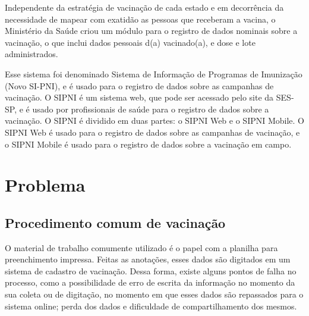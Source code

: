 Independente da estratégia de vacinação de cada estado e em decorrência da necessidade de mapear com exatidão as pessoas que receberam a vacina, o Ministério da Saúde criou um módulo para o registro de dados nominais sobre a vacinação, o que inclui dados pessoais d(a) vacinado(a), e dose e lote administrados.

Esse sistema foi denominado Sistema de Informação de Programas de Imunização (Novo SI-PNI), e é usado para o registro de dados sobre as campanhas de vacinação. O SIPNI é um sistema web, que pode ser acessado pelo site da SES-SP, e é usado por profissionais de saúde para o registro de dados sobre a vacinação. O SIPNI é dividido em duas partes: o SIPNI Web e o SIPNI Mobile. O SIPNI Web é usado para o registro de dados sobre as campanhas de vacinação, e o SIPNI Mobile é usado para o registro de dados sobre a vacinação em campo.


\section{Problema}
\label{cap1:Sec:Problema}

\subsection{Procedimento comum de vacinação}
\label{cap1:SubSec:cap1:ProcedimentoComumVacinacao}
O material de trabalho comumente utilizado é o papel com a planilha para preenchimento impressa. Feitas as anotações, esses dados são digitados em um sistema de cadastro de vacinação. Dessa forma, existe alguns pontos de falha no processo, como a possibilidade de erro de escrita da informação no momento da sua coleta ou de digitação, no momento em que esses dados são repassados para o sistema online; perda dos dados e dificuldade de compartilhamento dos mesmos.


